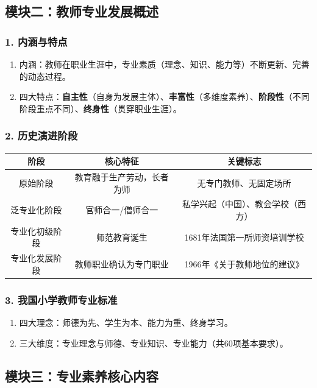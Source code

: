 \documentclass[12pt,a4paper]{article}
\begin{document}
\subsection{模块二：教师专业发展概述}
\subsubsection{1. 内涵与特点}
\begin{enumerate}[label=1.,itemsep=0.3ex]
\item 内涵：教师在职业生涯中，专业素质（理念、知识、能力等）不断更新、完善的动态过程。
\item 四大特点：\textbf{自主性}（自身为发展主体）、\textbf{丰富性}（多维度素养）、\textbf{阶段性}（不同阶段重点不同）、\textbf{终身性}（贯穿职业生涯）。
\end{enumerate}

\subsubsection{2. 历史演进阶段}
\begin{longtable}{|c|c|c|}
\hline
\textbf{阶段} & \textbf{核心特征} & \textbf{关键标志} \\
\hline
原始阶段 & 教育融于生产劳动，长者为师 & 无专门教师、无固定场所 \\
\hline
泛专业化阶段 & 官师合一/僧师合一 & 私学兴起（中国）、教会学校（西方） \\
\hline
专业化初级阶段 & 师范教育诞生 & 1681年法国第一所师资培训学校 \\
\hline
专业化发展阶段 & 教师职业确认为专门职业 & 1966年《关于教师地位的建议》 \\
\hline
\end{longtable}

\subsubsection{3. 我国小学教师专业标准}
\begin{enumerate}[label=•,itemsep=0.5ex]
\item 四大理念：师德为先、学生为本、能力为重、终身学习。
\item 三大维度：专业理念与师德、专业知识、专业能力（共60项基本要求）。
\end{enumerate}

\subsection{模块三：专业素养核心内容}
\end{document}
